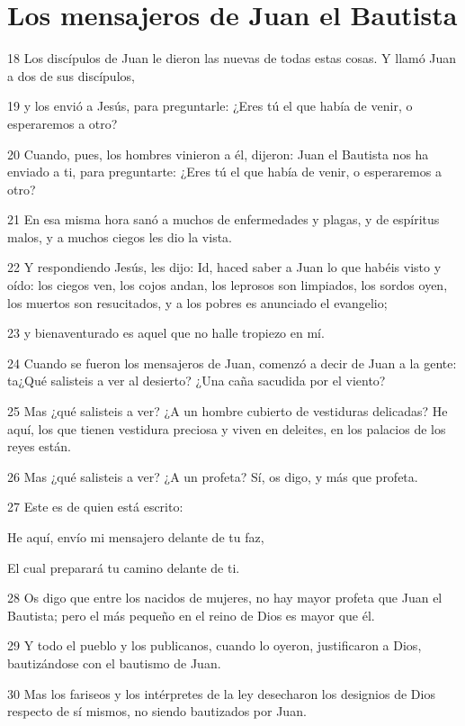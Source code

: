 \section*{Los mensajeros de Juan el Bautista}

\par 18 Los discípulos de Juan le dieron las nuevas de todas estas cosas. Y llamó Juan a dos de sus discípulos,
\par 19 y los envió a Jesús, para preguntarle: ¿Eres tú el que había de venir, o esperaremos a otro?
\par 20 Cuando, pues, los hombres vinieron a él, dijeron: Juan el Bautista nos ha enviado a ti, para preguntarte: ¿Eres tú el que había de venir, o esperaremos a otro?
\par 21 En esa misma hora sanó a muchos de enfermedades y plagas, y de espíritus malos, y a muchos ciegos les dio la vista.
\par 22 Y respondiendo Jesús, les dijo: Id, haced saber a Juan lo que habéis visto y oído: los ciegos ven, los cojos andan, los leprosos son limpiados, los sordos oyen, los muertos son resucitados, y a los pobres es anunciado el evangelio;
\par 23 y bienaventurado es aquel que no halle tropiezo en mí.
\par 24 Cuando se fueron los mensajeros de Juan, comenzó a decir de Juan a la gente: ta¿Qué salisteis a ver al desierto? ¿Una caña sacudida por el viento?
\par 25 Mas ¿qué salisteis a ver? ¿A un hombre cubierto de vestiduras delicadas? He aquí, los que tienen vestidura preciosa y viven en deleites, en los palacios de los reyes están.
\par 26 Mas ¿qué salisteis a ver? ¿A un profeta? Sí, os digo, y más que profeta.
\par 27 Este es de quien está escrito:
\par He aquí, envío mi mensajero delante de tu faz,
\par El cual preparará tu camino delante de ti.
\par 28 Os digo que entre los nacidos de mujeres, no hay mayor profeta que Juan el Bautista; pero el más pequeño en el reino de Dios es mayor que él.
\par 29 Y todo el pueblo y los publicanos, cuando lo oyeron, justificaron a Dios, bautizándose con el bautismo de Juan.
\par 30 Mas los fariseos y los intérpretes de la ley desecharon los designios de Dios respecto de sí mismos, no siendo bautizados por Juan.
